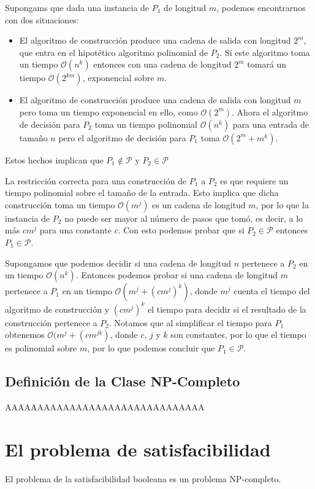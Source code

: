 \documentclass[a4paper]{article}
\begin{document}
Supongams que dada una instancia de $P_1$ de longitud $m$, podemos encontrarnos
con dos situaciones:
\begin{itemize}
  \item El algoritmo de construcción produce una cadena de salida con longitud $2^{m}$, que entra en el hipotético algoritmo polinomial de $P_2$. Si este algoritmo toma un tiempo $\mathcal{O}(n^k)$ entonces con una cadena de longitud $2^{m}$ tomará un tiempo $\mathcal{O}(2^{km})$, exponencial sobre $m$.
  \item El algoritmo de construcción produce una cadena de salida con longitud $m$ pero toma un tiempo exponencial en ello, como $\mathcal{O}(2^m)$. Ahora el algoritmo de decisión para $P_2$ toma un tiempo polinomial $\mathcal{O}(n^k)$ para una entrada de tamaño $n$ pero el algoritmo de decisión para $P_1$ toma $\mathcal{O}(2^{m} + m^{k})$.
\end{itemize}
Estos hechos implican que $P_1 \notin \mathcal{P}$ y $P_2 \in \mathcal{P}$

La restricción correcta para una construcción de $P_1$ a $P_2$ es que requiere
un tiempo polinomial sobre el tamaño de la entrada.
Esto implica que dicha construcción toma un tiempo $\mathcal{O}(m^{j})$ es un
cadena de longitud $m$, por lo que la instancia de $P_2$ no puede ser mayor al
número de pasos que tomó, es decir, a lo más $cm^{j}$ para una constante $c$.
Con esto podemos probar que si $P_2 \in \mathcal{P}$ entonces $P_1 \in \mathcal{P}$.

Supongamos que podemos decidir si una cadena de longitud $n$ pertenece a $P_2$
en un tiempo $\mathcal{O}(n^{k})$. Entonces podemos probar si una cadena de
longitud $m$ pertenece a $P_1$ en un tiempo $\mathcal{O}(m^j + (cm^j)^k)$,
donde $m^j$ cuenta el tiempo del algoritmo de construcción y $(cm^j)^k$ el
tiempo para decidir si el resultado de la construcción pertenece a $P_2$.
Notamos que al simplificar el tiempo para $P_1$ obtenemos
$\mathcal{O}(m^j + (cm^{jk})$, donde $c$, $j$ y $k$ son constantes, por lo que
el tiempo es polinomial sobre $m$, por lo que podemos concluir que $P_1 \in \mathcal{P}$.

\subsection{Definición de la Clase NP-Completo}

AAAAAAAAAAAAAAAAAAAAAAAAAAAAAAA

\section{El problema de satisfacibilidad}
El problema de la satisfacibilidad booleana es un problema NP-completo\cite{cook1971complexity}.
\end{document}
